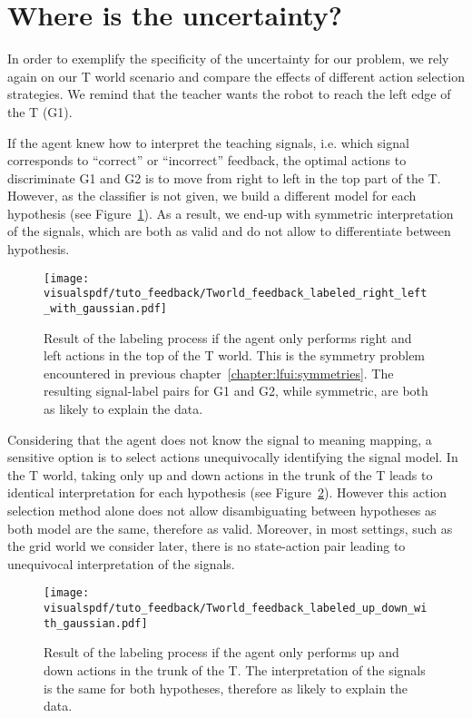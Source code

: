 \section{Where is the uncertainty?}
\label{chapter:planning:where}

In order to exemplify the specificity of the uncertainty for our problem, we rely again on our T world scenario and compare the effects of different action selection strategies. We remind that the teacher wants the robot to reach the left edge of the T (G1).

If the agent knew how to interpret the teaching signals, i.e. which signal corresponds to ``correct'' or ``incorrect'' feedback, the optimal actions to discriminate G1 and G2 is to move from right to left in the top part of the T. However, as the classifier is not given, we build a different model for each hypothesis (see Figure~\ref{fig:planningrightleft}). As a result, we end-up with symmetric interpretation of the signals, which are both as valid and do not allow to differentiate between hypothesis.

\begin{figure}[!htbp]
  \centering
  \texttt{[image: \\visualspdf/tuto\_feedback/Tworld\_feedback\_labeled\_right\_left\_with\_gaussian.pdf]}
  \caption{Result of the labeling process if the agent only performs right and left actions in the top of the T world. This is the symmetry problem encountered in previous chapter~\ref{chapter:lfui:symmetries}. The resulting signal-label pairs for G1 and G2, while symmetric, are both as likely to explain the data.}
  \label{fig:planningrightleft}
\end{figure}

Considering that the agent does not know the signal to meaning mapping, a sensitive option is to select actions unequivocally identifying the signal model. In the T world, taking only up and down actions in the trunk of the T leads to identical interpretation for each hypothesis (see Figure~\ref{fig:planningupdown}). However this action selection method alone does not allow disambiguating between hypotheses as both model are the same, therefore as valid. Moreover, in most settings, such as the grid world we consider later, there is no state-action pair leading to unequivocal interpretation of the signals.

\begin{figure}[!htbp]
  \centering
  \texttt{[image: \\visualspdf/tuto\_feedback/Tworld\_feedback\_labeled\_up\_down\_with\_gaussian.pdf]}
  \caption{Result of the labeling process if the agent only performs up and down actions in the trunk of the T. The interpretation of the signals is the same for both hypotheses, therefore as likely to explain the data.}
  \label{fig:planningupdown}
\end{figure}

